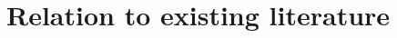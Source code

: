\documentclass[12pt,a4paper]{article}
\begin{document}







\section{Relation to existing literature}
\end{document}

